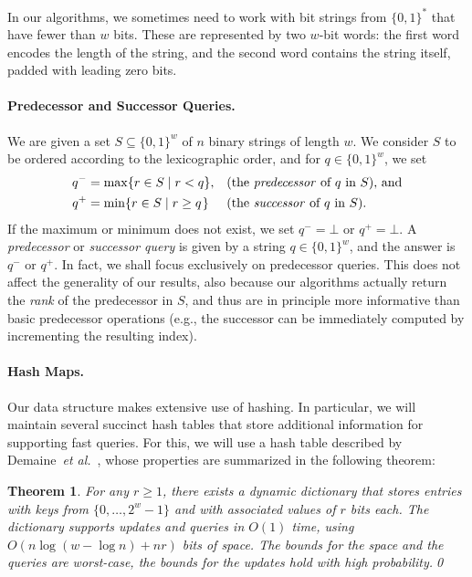 \documentclass[a4paper,11pt]{article}
\newtheorem{theorem}{Theorem}[section]
\newcommand{\etal}{\emph{et al.}\xspace}
\newcommand{\?}{\mskip1.5mu}
\begin{document}
In our algorithms, we sometimes need to work with
bit strings from $\{0, 1\}^*$ that have fewer than $w$ bits. 
These are represented by
two $w$-bit words: the first word encodes the length of the string, 
and the second word contains the string itself, padded with leading
zero bits.

\paragraph{Predecessor and Successor Queries.}
We are given a set $S \subseteq \{0, 1\}^w$ of $n$ binary strings of 
length $w$. We consider $S$ to be ordered according to the 
lexicographic order, and for $q \in \{0, 1\}^w$, we set
\begin{align*}
     q^- &= \max \{r \in S \mid r < q\},  && 
        \text{(the \emph{predecessor} of $q$ in $S$), and} \\
     q^+ &= \min \{r \in S \mid r \geq q\?\} && 
       \text{(the \emph{successor} of $q$ in $S$)}.
\end{align*}
If the maximum or minimum does not exist, we set $q^- = \bot$ or 
$q^+ = \bot$.  A \emph{predecessor} or \emph{successor query} is
given by a string $q \in \{0, 1\}^w$, and the answer is $q^-$ or 
$q^+$. In fact, we shall focus exclusively on predecessor queries. 
This does not affect the generality of our results,
also because our algorithms actually return the \emph{rank} of the 
predecessor in $S$, and thus are in principle more informative 
than basic predecessor operations
(e.g., the successor can be immediately computed by incrementing 
the resulting index).

\paragraph{Hash Maps.}
Our data structure makes extensive use of
hashing. In particular, we will maintain several
succinct hash tables that store additional
information for supporting fast queries.
For this, we will use a hash table described
by Demaine~\etal~\cite{DemaineMePaPa06}, whose
properties are summarized in the following theorem:

\begin{theorem}\label{thm:succinct_retrieval_only_hashtable}
For any $r \geq 1$, there exists a dynamic dictionary that
stores entries with keys from $\{0, \dots, 2^w-1\}$ and with 
associated values of $r$ bits each.
The dictionary supports updates and queries in $O(1)$ time,
using $O(n \log(w - \log n) + nr)$ \emph{bits} of space.
The bounds for the space and the queries are
worst-case, the bounds for the updates hold with
high probability.\qed
\end{theorem}
\end{document}
